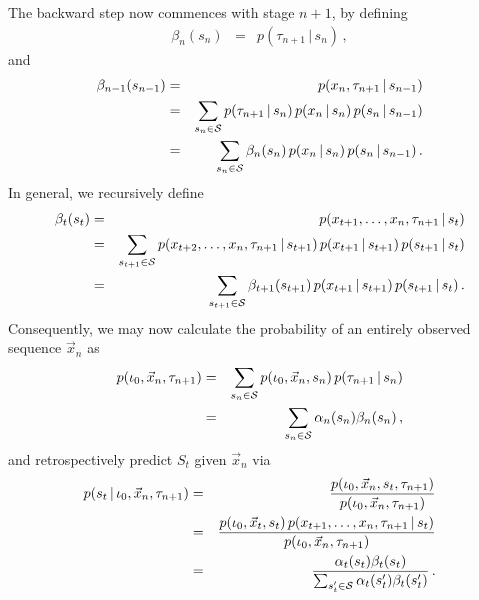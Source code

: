 \documentclass[a4paper]{article}
\begin{document}
The backward step now commences with stage $n+1$, by defining
\begin{eqnarray}
  \beta_{n}(s_{n}) & = & p(\tau_{n+1}\,|\,s_{n})
\,,
\end{eqnarray}
and 
\begin{eqnarray}
  \beta_{n-1}(s_{n-1}) & = & p(x_{n},\tau_{n+1}\,|\,s_{n-1})
\nonumber\\
& = &
\sum_{s_n\in{\cal S}}p(\tau_{n+1}\,|\,s_{n})\,p(x_n\,|\,s_n)\,p(s_n\,|\,s_{n-1})
\nonumber\\
& = &
\sum_{s_n\in{\cal S}}\beta_n(s_{n})\,p(x_n\,|\,s_n)\,p(s_n\,|\,s_{n-1})
\,.
\end{eqnarray}
In general, we recursively define
\begin{eqnarray}
  \beta_{t}(s_{t}) & = & p(x_{t+1},\ldots,x_{n},\tau_{n+1}\,|\,s_{t})
\nonumber\\
& = &
\sum_{s_{t+1}\in{\cal S}}
  p(x_{t+2},\ldots,x_{n},\tau_{n+1}\,|\,s_{t+1})\,p(x_{t+1}\,|\,s_{t+1})\,p(s_{t+1}\,|\,s_t)
\nonumber\\
& = &
\sum_{s_{t+1}\in{\cal S}}\beta_{t+1}(s_{t+1})\,p(x_{t+1}\,|\,s_{t+1})\,p(s_{t+1}\,|\,s_t)
\,.
\end{eqnarray}
Consequently, we may now calculate the probability of an entirely observed sequence $\vec{x}_n$ as
\begin{eqnarray}
  p(\iota_0,\vec{x}_n,\tau_{n+1}) & = & 
  \sum_{s_n\in{\cal S}}p(\iota_0,\vec{x}_n,s_n)\,p(\tau_{n+1}\,|\,s_n)
\nonumber\\& = &
  \sum_{s_n\in{\cal S}}\alpha_n(s_n)\beta_n(s_n)\,,
\end{eqnarray}
and retrospectively predict $S_t$ given $\vec{x}_n$ via
\begin{eqnarray}
  p(s_t\,|\,\iota_0,\vec{x}_n,\tau_{n+1}) & = & 
\frac{p(\iota_0,\vec{x}_n,s_t,\tau_{n+1})}
       {p(\iota_0,\vec{x}_n,\tau_{n+1})}
\nonumber\\& = &
\frac{p(\iota_0,\vec{x}_t,s_t)\,p(x_{t+1},\ldots,x_n,\tau_{n+1}\,|\,s_t)}{p(\iota_0,\vec{x}_n,\tau_{n+1})}
\nonumber\\& = &
\frac{\alpha_t(s_t)\beta_t(s_t)}{\sum_{s_t'\in{\cal S}}\alpha_t(s_t')\beta_t(s_t')}\,.
\end{eqnarray}

\end{document}
